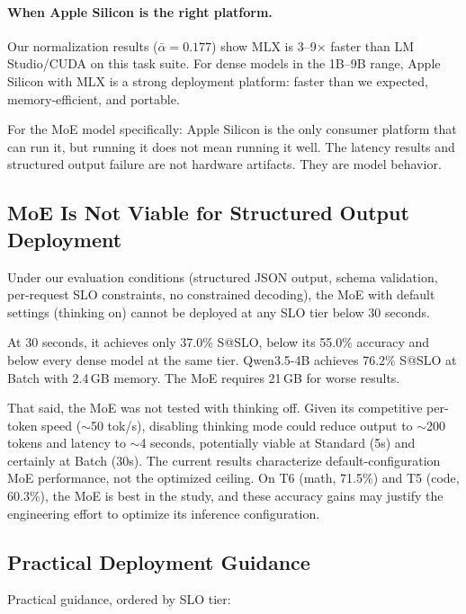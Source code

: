 \documentclass[11pt]{article}
\begin{document}
\paragraph{When Apple Silicon is the right platform.}
Our normalization results ($\bar{\alpha} = 0.177$) show MLX is 3--9$\times$ faster than LM Studio/CUDA on this task suite.  For dense models in the 1B--9B range, Apple Silicon with MLX is a strong deployment platform: faster than we expected, memory-efficient, and portable.

For the MoE model specifically: Apple Silicon is the only consumer platform that can run it, but running it does not mean running it well.  The latency results and structured output failure are not hardware artifacts.  They are model behavior.

\subsection{MoE Is Not Viable for Structured Output Deployment}
\label{sec:moe-not-viable}

Under our evaluation conditions (structured JSON output, schema validation, per-request SLO constraints, no constrained decoding), the MoE with default settings (thinking on) cannot be deployed at any SLO tier below 30 seconds.

At 30 seconds, it achieves only 37.0\% S@SLO, below its 55.0\% accuracy and below every dense model at the same tier.  Qwen3.5-4B achieves 76.2\% S@SLO at Batch with 2.4\,GB memory.  The MoE requires 21\,GB for worse results.

That said, the MoE was not tested with thinking off.  Given its competitive per-token speed (${\sim}$50 tok/s), disabling thinking mode could reduce output to ${\sim}$200 tokens and latency to ${\sim}$4 seconds, potentially viable at Standard (5s) and certainly at Batch (30s).  The current results characterize default-configuration MoE performance, not the optimized ceiling.  On T6 (math, 71.5\%) and T5 (code, 60.3\%), the MoE is best in the study, and these accuracy gains may justify the engineering effort to optimize its inference configuration.

\subsection{Practical Deployment Guidance}
\label{sec:deployment-guidance}

Practical guidance, ordered by SLO tier:
\end{document}
